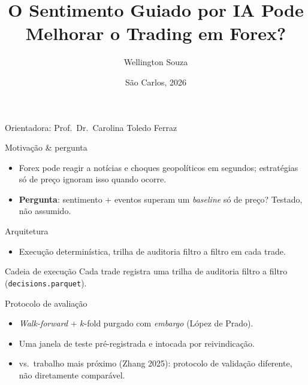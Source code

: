 \documentclass[aspectratio=169,17pt]{beamer}
\title[IA Melhora o Trading em Forex?]{O Sentimento Guiado por IA Pode Melhorar o Trading em Forex?}
\author[Wellington Souza]{Wellington Souza}
\institute[ICMC/USP]{MBA em Intelig\^encia Artificial e Big Data \\ ICMC, Universidade de S\~ao Paulo}
\date{S\~ao Carlos, 2026}
\begin{document}
\begin{frame}
  \titlepage
  \vspace{-0.6cm}
  \begin{center}
    \small Orientadora: Prof.\ Dr.\ Carolina Toledo Ferraz
  \end{center}
\end{frame}

\begin{frame}{Motivação \& pergunta}
  \begin{itemize}
    \item Forex pode reagir a notícias e choques geopolíticos em segundos; estratégias só de preço ignoram isso quando ocorre.
    \item \textbf{Pergunta}: sentimento + eventos superam um \textit{baseline} só de preço? Testado, não assumido.
  \end{itemize}
\end{frame}

\begin{frame}{Arquitetura}
  \centering
  \resizebox{0.8\textwidth}{!}{}
  \begin{itemize}
    \item Execução determinística, trilha de auditoria filtro a filtro em cada trade.
  \end{itemize}
\end{frame}

\begin{frame}{Cadeia de execução}
  \centering
  \resizebox{0.75\textwidth}{!}{}
  \footnotesize Cada trade registra uma trilha de auditoria filtro a filtro (\texttt{decisions.parquet}).
\end{frame}

\begin{frame}{Protocolo de avaliação}
  \begin{itemize}
    \item \textit{Walk-forward} + $k$-fold purgado com \textit{embargo} (López de Prado).
    \item Uma janela de teste pré-registrada e intocada por reivindicação.
    \item vs.\ trabalho mais próximo (Zhang 2025): protocolo de validação diferente, não diretamente comparável.
  \end{itemize}
\end{frame}
\end{document}
